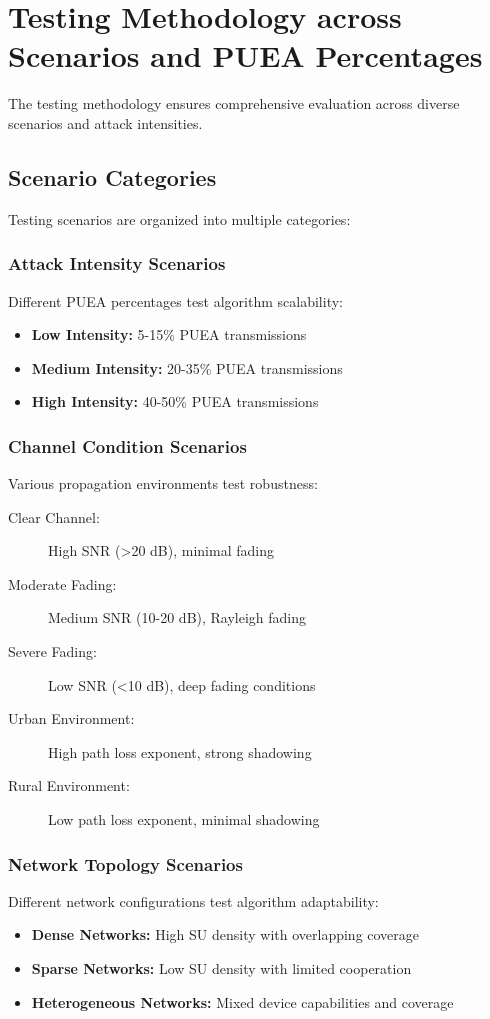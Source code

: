 \section{Testing Methodology across Scenarios and PUEA Percentages}
The testing methodology ensures comprehensive evaluation across diverse scenarios and attack intensities.

\subsection{Scenario Categories}
Testing scenarios are organized into multiple categories:

\subsubsection{Attack Intensity Scenarios}
Different PUEA percentages test algorithm scalability:
\begin{itemize}
\item \textbf{Low Intensity:} 5-15\% PUEA transmissions
\item \textbf{Medium Intensity:} 20-35\% PUEA transmissions  
\item \textbf{High Intensity:} 40-50\% PUEA transmissions
\end{itemize}

\subsubsection{Channel Condition Scenarios}
Various propagation environments test robustness:
\begin{description}
\item[Clear Channel:] High SNR (>20 dB), minimal fading
\item[Moderate Fading:] Medium SNR (10-20 dB), Rayleigh fading
\item[Severe Fading:] Low SNR (<10 dB), deep fading conditions
\item[Urban Environment:] High path loss exponent, strong shadowing
\item[Rural Environment:] Low path loss exponent, minimal shadowing
\end{description}

\subsubsection{Network Topology Scenarios}
Different network configurations test algorithm adaptability:
\begin{itemize}
\item \textbf{Dense Networks:} High SU density with overlapping coverage
\item \textbf{Sparse Networks:} Low SU density with limited cooperation
\item \textbf{Heterogeneous Networks:} Mixed device capabilities and coverage
\end{itemize}

